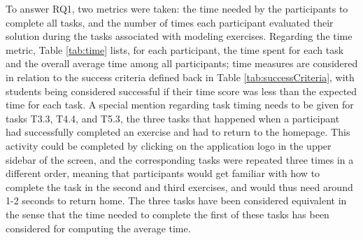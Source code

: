 To answer RQ1, two metrics were taken: the time needed by the participants to complete all tasks, and the number of times each participant evaluated their solution during the tasks associated with modeling exercises. Regarding the time metric, Table \ref{tab:time} lists, for each participant, the time spent for each task and the overall average time among all participants; time measures are considered in relation to the success criteria defined back in Table \ref{tab:successCriteria}, with students being considered successful if their time score was less than the expected time for each task. A special mention regarding task timing needs to be given for tasks T3.3, T4.4, and T5.3, the three tasks that happened when a participant had successfully completed an exercise and had to return to the homepage. This activity could be completed by clicking on the application logo in the upper sidebar of the screen, and the corresponding tasks were repeated three times in a different order, meaning that participants would get familiar with how to complete the task in the second and third exercises, and would thus need around 1-2 seconds to return home. The three tasks have been considered equivalent in the sense that the time needed to complete the first of these tasks has been considered for computing the average time.

